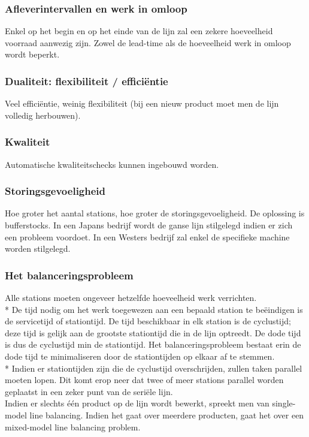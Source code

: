 \documentclass[12pt]{article}
\begin{document}
\subsubsection{Afleverintervallen en werk in omloop}
Enkel op het begin en op het einde van de lijn zal een zekere hoeveelheid voorraad aanwezig zijn. Zowel de lead-time als de hoeveelheid werk in omloop wordt beperkt.
\subsubsection{Dualiteit: flexibiliteit / effici\"entie}
Veel effici\"entie, weinig flexibiliteit (bij een nieuw product moet men de lijn volledig herbouwen).
\subsubsection{Kwaliteit}
Automatische kwaliteitschecks kunnen ingebouwd worden.
\subsubsection{Storingsgevoeligheid}
Hoe groter het aantal stations, hoe groter de storingsgevoeligheid. De oplossing is bufferstocks. In een Japans bedrijf wordt de ganse lijn stilgelegd indien er zich een probleem voordoet. In een Westers bedrijf zal enkel de specifieke machine worden stilgelegd.
\subsubsection{Het balanceringsprobleem}
Alle stations moeten ongeveer hetzelfde hoeveelheid werk verrichten.\\*
De tijd nodig om het werk toegewezen aan een bepaald station te be\"eindigen is de servicetijd of stationtijd. De tijd beschikbaar in elk station is de cyclustijd; deze tijd is gelijk aan de grootste stationtijd die in de lijn optreedt. De dode tijd is dus de cyclustijd min de stationtijd. Het balanceringsprobleem bestaat erin de dode tijd te minimaliseren door de stationtijden op elkaar af te stemmen.\\*
Indien er stationtijden zijn die de cyclustijd overschrijden, zullen taken parallel moeten lopen. Dit komt erop neer dat twee of meer stations parallel worden geplaatst in een zeker punt van de seri\"ele lijn.\\
Indien er slechts \'e\'en product op de lijn wordt bewerkt, spreekt men van single-model line balancing. Indien het gaat over meerdere producten, gaat het over een mixed-model line balancing problem.
\end{document}
